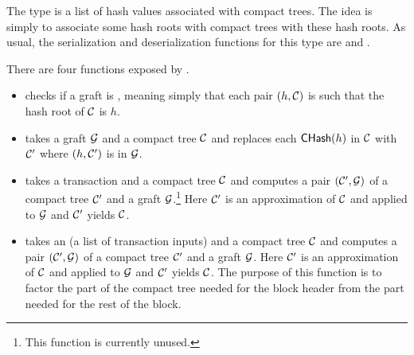 The type {} is a list of hash values associated with compact trees.
The idea is simply to associate some hash roots with compact trees with these hash roots.
As usual, the serialization and deserialization functions
for this type are
{}
and
{}.

There are four functions exposed by {}.
\begin{itemize}
\item {} checks if a graft is {}, meaning simply that
each pair $(h,\mathcal{C})$ is such that the hash root of $\mathcal{C}$ is $h$.
\item {} takes a graft $\mathcal{G}$ and a compact tree $\mathcal{C}$
and replaces each ${\constr{CHash}}(h)$ in $\mathcal{C}$ with $\mathcal{C}'$
where $(h,\mathcal{C}')$ is in $\mathcal{G}$.
\item {} takes a transaction and a compact tree $\mathcal{C}$
and computes a pair $(\mathcal{C}',\mathcal{G})$ of a compact tree $\mathcal{C}'$ and a graft $\mathcal{G}$.\footnote{This function is currently unused.}
Here $\mathcal{C}'$ is an approximation of $\mathcal{C}$
and {} applied to $\mathcal{G}$ and $\mathcal{C}'$ yields $\mathcal{C}$.
\item {} takes an {}
(a list of transaction inputs)
and a compact tree $\mathcal{C}$
and computes a pair $(\mathcal{C}',\mathcal{G})$ of a compact tree $\mathcal{C}'$ and a graft $\mathcal{G}$.
Here $\mathcal{C}'$ is an approximation of $\mathcal{C}$
and {} applied to $\mathcal{G}$ and $\mathcal{C}'$ yields $\mathcal{C}$.
The purpose of this function is to factor the part of the compact tree
needed for the block header from the part needed for the rest of the block.
\end{itemize}
